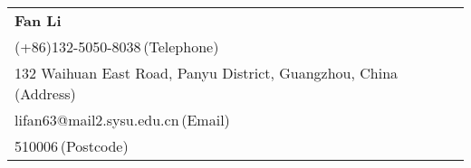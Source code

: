 \newcommand{\myheader}{
\begin{tabular*}{\textwidth}{l@{\extracolsep{\fill}}r}
  \textbf{{\LARGE Fan Li}} \\ (+86)132-5050-8038$\,${\color{labelgrey}(Telephone)} \\
  132 Waihuan East Road, Panyu District, Guangzhou, China$\,${\color{labelgrey}(Address)} \\
{lifan63@mail2.sysu.edu.cn}$\,${\color{labelgrey}(Email)} \\
  510006$\,${\color{labelgrey}(Postcode)}
  \end{tabular*}\\\vspace{0.1in}}

\myheader